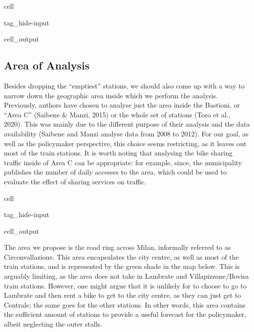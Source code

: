 \documentclass[letterpaper,10pt,english]{jupyterBook}
\begin{document}
\begin{sphinxuseclass}{cell}
\begin{sphinxuseclass}{tag_hide-input}
\begin{sphinxuseclass}{cell_output}
\noindent{}

\end{sphinxuseclass}
\end{sphinxuseclass}
\end{sphinxuseclass}

\subsection{Area of Analysis}
\label{\detokenize{03-data_ingestion_and_spatial_operations:area-of-analysis}}
\sphinxAtStartPar
Besides dropping the “emptiest” stations, we should also come up with a way to narrow down the geographic area inside which we perform the analysis. Previously, authors have chosen to analyse just the area inside the Bastioni, or “Area C” (Saibene \& Manzi, 2015) or the whole set of stations (Toro et al., 2020). This was mainly due to the different purpose of their analysis and the data availability (Saibene and Manzi analyse data from 2008 to 2012). For our goal, as well as the policymaker perspective, this choice seems restricting, as it leaves out most of the train stations. It is worth noting that analysing the bike sharing traffic inside of Area C can be appropriate: for example, since, the municipality publishes the number of daily accesses to the area, which could be used to evaluate the effect of sharing services on traffic.

\begin{sphinxuseclass}{cell}
\begin{sphinxuseclass}{tag_hide-input}
\begin{sphinxuseclass}{cell_output}
\noindent{}

\end{sphinxuseclass}
\end{sphinxuseclass}
\end{sphinxuseclass}
\sphinxAtStartPar
The area we propose is the road ring across Milan, informally referred to as Circonvallazione. This area encapsulates the city centre, as well as most of the train stations, and is represented by the green shade in the map below. This is arguably limiting, as the area does not take in Lambrate and Villapizzone/Bovisa train stations. However, one might argue that it is unlikely for to choose to go to Lambrate and then rent a bike to get to the city centre, as they can just get to Centrale; the same goes for the other stations. In other words, this area contains the sufficient amount of stations to provide a useful forecast for the policymaker, albeit neglecting the outer stalls.
\end{document}

